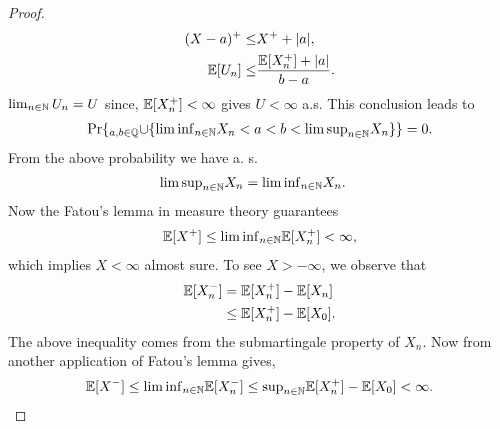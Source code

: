 \documentclass[a4paper,10pt,english]{article}
\begin{document}
\begin{proof}    		
\begin{align*}
(X-a)^{+}\leq& X^{+}+|a|,\\
\mathbb{E}[U_n] \leq& \frac{\mathbb{E}[X_n^{+}] +|a|}{b-a}.
\end{align*}
    			$\lim_{n \in \mathbb{N}} U_n=U$ since, $\mathbb{E} [X_n^{+}] < \infty$ gives $U<\infty$ a.s. This conclusion leads to  
    			\begin{align*}
    			\Pr\{_{a,b \in \mathbb{Q}}{\cup}\{{\lim \inf}_{n\in \mathbb{N}}  X_n<a<b<{\lim \sup}_{n\in \mathbb{N}}  X_n \}\} = 0.
    			\end{align*}
    		  From the above probability we have a. s.
    		  \begin{align*}
    		  	{\lim \sup}_{n\in \mathbb{N}}  X_n &={\lim \inf}_{n\in \mathbb{N}}  X_n.
    		  	\end{align*}
    		  	Now the Fatou's lemma in measure theory guarantees
    		  	\begin {align*}
    		  	\mathbb{E}[X^{+}]\leq {\lim \inf}_{n\in \mathbb{N}}\mathbb{E}[X_n^{+}]<\infty,
    		  \end{align*}
    		  	which implies $X<\infty$  almost sure. To see $X>-\infty$, we observe that
    		  	\begin{align*}
    		  		\mathbb{E}[X_n^{-}]&=\mathbb{E}[X_n^{+}]-\mathbb{E}[X_n]\\
    		  		&\leq \mathbb{E}[X_n^{+}]-\mathbb{E}[X_0].
    		  		\end{align*} 
    		  		The above inequality comes from the submartingale property of $X_n$. Now from another application of Fatou's lemma gives,
    		  		\begin{align*}
    		  		\mathbb{E}[X^{-}]\leq {\lim \inf} _{n\in \mathbb{N}}\mathbb{E}[X_n^{-}] \leq {\sup}_{n\in \mathbb{N}}\mathbb{E}[X_n^{+}]-\mathbb{E}[X_0]<\infty.
    		  		\end{align*}
    		\end{proof}
\end{document}
